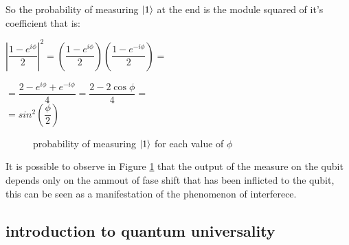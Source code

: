 \documentclass{article}
\begin{document}
\vspace{20pt}

So the probability of measuring $\ket{1}$ at the end is the module squared of it's\\
coefficient that is:\\
\vspace{10pt}

$\left|\dfrac{1-e^{i\phi}}{2}\right|^2 = \left(\dfrac{1-e^{i\phi}}{2}\right)\left(\dfrac{1-e^{-i\phi}}{2}\right) =$\\
\vspace{5pt}


$ = \dfrac{2-e^{i\phi}+e^{-i\phi}}{4} = \dfrac{2-2\cos{\phi}}{4} =$\\

\vspace{3pt}
$ = sin^2{\left(\dfrac{\phi}{2}\right)}$

\vspace{10pt}



\begin{figure}[H]
	\centering
	\caption{probability of measuring $\ket{1}$ for each value of $\phi$}
	\label{interferencegraph}
\end{figure}

It is possible to observe in Figure \ref{interferencegraph}
that the output of the measure on the qubit depends only on the
ammout of fase shift that has been inflicted
to the qubit, this can be seen as a manifestation of the phenomenon
of interferece.

\newpage

\subsection{introduction to quantum universality}
\end{document}
